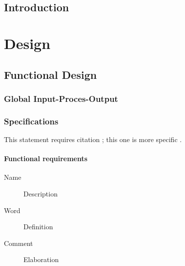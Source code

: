 \documentclass[11pt,fleqn,,a4paper,twoside,openright]{book} %
\begin{document}

\pagestyle{empty} %

\tableofcontents %

\cleardoublepage %

\pagestyle{fancy} %

\chapter{Introduction}
\lipsum[3-5]

\newpage
\part{Design}



\chapter{Functional Design}

\section{Global Input-Proces-Output}

\lipsum[1-7] %

\section{Specifications}

This statement requires citation \cite{book_key}; this one is more specific \cite[122]{article_key}.
\subsection{Functional requirements}
\begin{description}
	\item[Name] Description
	\item[Word] Definition
	\item[Comment] Elaboration
\end{description}
\end{document}
